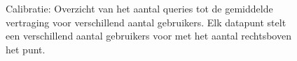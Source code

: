 \begin{figure}[h!] 
\centering
	\caption{Calibratie: Overzicht van het aantal queries tot de gemiddelde vertraging voor verschillend aantal gebruikers. Elk datapunt stelt een verschillend aantal gebruikers voor met het aantal rechtsboven het punt. }
	\label{fig:calibratie-gebruikers-resultaat}
\end{figure}

